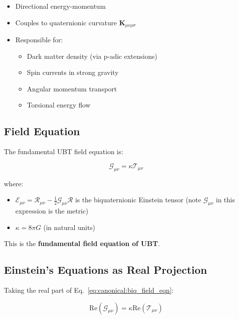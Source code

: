 \begin{itemize}
    \item Directional energy-momentum
    \item Couples to quaternionic curvature $\mathbf{K}_{\mu\nu\rho\sigma}$
    \item Responsible for:
    \begin{itemize}
        \item Dark matter density (via p-adic extensions)
        \item Spin currents in strong gravity
        \item Angular momentum transport
        \item Torsional energy flow
    \end{itemize}
\end{itemize}

\subsection{Field Equation}

The fundamental UBT field equation is:

\begin{equation}
\label{eq:canonical:biq_field_eqn}
\boxed{\mathcal{G}_{\mu\nu} = \kappa \mathcal{T}_{\mu\nu}}
\end{equation}

\noindent where:
\begin{itemize}
    \item $\mathcal{E}_{\mu\nu} = \mathcal{R}_{\mu\nu} - \frac{1}{2}\mathcal{G}_{\mu\nu}\mathcal{R}$ is the biquaternionic Einstein tensor (note $\mathcal{G}_{\mu\nu}$ in this expression is the metric)
    \item $\kappa = 8\pi G$ (in natural units)
\end{itemize}

This is the \textbf{fundamental field equation of UBT}.

\subsection{Einstein's Equations as Real Projection}

Taking the real part of Eq.~\ref{eq:canonical:biq_field_eqn}:

\begin{equation}
\text{Re}(\mathcal{G}_{\mu\nu}) = \kappa \text{Re}(\mathcal{T}_{\mu\nu})
\end{equation}

